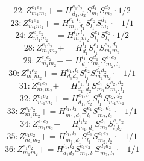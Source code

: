 \documentclass[letterpaper,10pt,fleqn,leqno,onecolumn]{article}
\begin{document}
\begin{equation} \;\;\;\;\;\;  22: Z^{e_{1}e_{2}}_{m_{1}m_{2}}+=H^{e_{1}e_{2}}_{d_{1},d_{2}}S^{d_{1}}_{m_{1}}S^{d_{2}}_{m_{2}}\cdot 1/2 \end{equation}
\begin{equation} \;\;\;\;\;\;  23: Z^{e_{1}e_{2}}_{m_{1}m_{2}}+=H^{e_{1},l_{1}}_{m_{1},d_{1}}S^{e_{2}}_{l_{1}}S^{d_{1}}_{m_{2}}\cdot -1/1 \end{equation}
\begin{equation} \;\;\;\;\;\;  24: Z^{e_{1}e_{2}}_{m_{1}m_{2}}+=H^{l_{1},l_{2}}_{m_{1}m_{2}}S^{e_{1}}_{l_{1}}S^{e_{2}}_{l_{2}}\cdot 1/2 \end{equation}
\begin{equation} \;\;\;\;\;\;  28: Z^{e_{1}e_{2}}_{m_{1}m_{2}}+=H^{l_{1}}_{d_{1}}S^{e_{1}}_{l_{1}}S^{e_{2},d_{1}}_{m_{1}m_{2}} \end{equation}
\begin{equation} \;\;\;\;\;\;  29: Z^{e_{1}e_{2}}_{m_{1}m_{2}}+=H^{l_{1}}_{d_{1}}S^{d_{1}}_{m_{1}}S^{e_{1}e_{2}}_{m_{2},l_{1}} \end{equation}
\begin{equation} \;\;\;\;\;\;  30: Z^{e_{1}e_{2}}_{m_{1}m_{2}}+=H^{e_{1},l_{1}}_{d_{1}d_{2}}S^{e_{2}}_{l_{1}}S^{d_{1}d_{2}}_{m_{1}m_{2}}\cdot -1/1 \end{equation}
\begin{equation} \;\;\;\;\;\;  31: Z^{e_{1}e_{2}}_{m_{1}m_{2}}+=H^{e_{1},l_{1}}_{d_{1},d_{2}}S^{d_{1}}_{m_{1}}S^{e_{2},d_{2}}_{m_{2},l_{1}} \end{equation}
\begin{equation} \;\;\;\;\;\;  32: Z^{e_{1}e_{2}}_{m_{1}m_{2}}+=H^{e_{1},l_{1}}_{d_{1},d_{2}}S^{d_{1}}_{l_{1}}S^{e_{2},d_{2}}_{m_{1}m_{2}} \end{equation}
\begin{equation} \;\;\;\;\;\;  33: Z^{e_{1}e_{2}}_{m_{1}m_{2}}+=H^{l_{1},l_{2}}_{m_{1},d_{1}}S^{e_{1}}_{l_{1}}S^{e_{2},d_{1}}_{m_{2},l_{2}}\cdot -1/1 \end{equation}
\begin{equation} \;\;\;\;\;\;  34: Z^{e_{1}e_{2}}_{m_{1}m_{2}}+=H^{l_{1}l_{2}}_{m_{1},d_{1}}S^{d_{1}}_{m_{2}}S^{e_{1}e_{2}}_{l_{1}l_{2}} \end{equation}
\begin{equation} \;\;\;\;\;\;  35: Z^{e_{1}e_{2}}_{m_{1}m_{2}}+=H^{l_{1},l_{2}}_{m_{1},d_{1}}S^{d_{1}}_{l_{1}}S^{e_{1}e_{2}}_{m_{2},l_{2}}\cdot -1/1 \end{equation}
\begin{equation} \;\;\;\;\;\;  36: Z^{e_{1}e_{2}}_{m_{1}m_{2}}+=H^{l_{1},l_{2}}_{d_{1}d_{2}}S^{e_{1}e_{2}}_{m_{1},l_{1}}S^{d_{1}d_{2}}_{m_{2},l_{2}}\cdot -1/1 \end{equation}
\end{document}
